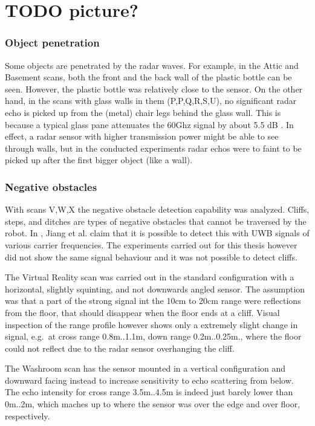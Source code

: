 \section{TODO picture?}\label{todo-picture}

\subsubsection{Object penetration}\label{object-penetration}

Some objects are penetrated by the radar waves. For example, in the
Attic and Basement scans, both the front and the back wall of the
plastic bottle can be seen. However, the plastic bottle was relatively
close to the sensor. On the other hand, in the scans with glass walls in
them (P,P,Q,R,S,U), no significant radar echo is picked up from the
(metal) chair legs behind the glass wall. This is because a typical
glass pane attenuates the 60Ghz signal by about 5.5 dB \cite{Lu2014}. In
effect, a radar sensor with higher transmission power might be able to
see through walls, but in the conducted experiments radar echos were to
faint to be picked up after the first bigger object (like a wall).

\subsubsection{Negative obstacles}\label{negative-obstacles}

With scans V,W,X the negative obstacle detection capability was
analyzed. Cliffs, steps, and ditches are types of negative obstacles
that cannot be traversed by the robot. In \cite{Jiang2015}, Jiang et al.
claim that it is possible to detect this with UWB signals of various
carrier frequencies. The experiments carried out for this thesis however
did not show the same signal behaviour and it was not possible to detect
cliffs.

The Virtual Reality scan was carried out in the standard configuration
with a horizontal, slightly squinting, and not downwards angled sensor.
The assumption was that a part of the strong signal int the 10cm to 20cm
range were reflections from the floor, that should disappear when the
floor ends at a cliff. Visual inspection of the range profile however
shows only a extremely slight change in signal, e.g.~at cross range
0.8m..1.1m, down range 0.2m..0.25m., where the floor could not reflect
due to the radar sensor overhanging the cliff.

The Washroom scan has the sensor mounted in a vertical configuration and
downward facing instead to increase sensitivity to echo scattering from
below. The echo intensity for cross range 3.5m..4.5m is indeed just
barely lower than 0m..2m, which maches up to where the sensor was over
the edge and over floor, respectively.

